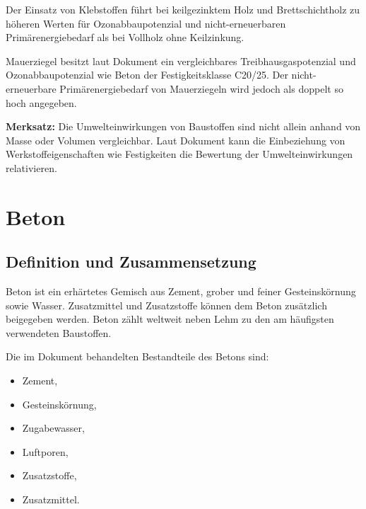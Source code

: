 \documentclass[
  12pt,
  a4paper,
  oneside
]{scrreprt}
\begin{document}
Der Einsatz von Klebstoffen führt bei keilgezinktem Holz und
Brettschichtholz zu höheren Werten für Ozonabbaupotenzial und
nicht-erneuerbaren Primärenergiebedarf als bei Vollholz ohne
Keilzinkung. 

Mauerziegel besitzt laut Dokument ein vergleichbares
Treibhausgaspotenzial und Ozonabbaupotenzial wie Beton der
Festigkeitsklasse C20/25. Der nicht-erneuerbare Primärenergiebedarf
von Mauerziegeln wird jedoch als doppelt so hoch angegeben.


\begin{merksatzbox}
\textbf{Merksatz:}
Die Umwelteinwirkungen von Baustoffen sind nicht allein anhand von
Masse oder Volumen vergleichbar. Laut Dokument kann die Einbeziehung
von Werkstoffeigenschaften wie Festigkeiten die Bewertung der
Umwelteinwirkungen relativieren. 
\end{merksatzbox}

%

\chapter{Beton}

\section{Definition und Zusammensetzung}

Beton ist ein erhärtetes Gemisch aus Zement, grober und feiner
Gesteinskörnung sowie Wasser. Zusatzmittel und Zusatzstoffe können
dem Beton zusätzlich beigegeben werden. Beton zählt weltweit neben
Lehm zu den am häufigsten verwendeten Baustoffen.


Die im Dokument behandelten Bestandteile des Betons sind:

\begin{itemize}
  \item Zement,
  \item Gesteinskörnung,
  \item Zugabewasser,
  \item Luftporen,
  \item Zusatzstoffe,
  \item Zusatzmittel.
\end{itemize}
\end{document}
